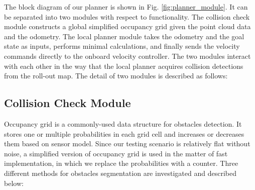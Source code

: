\documentclass[../thesis.tex]{subfiles}
\begin{document}
The block diagram of our planner is shown in Fig. \ref{fig:planner_module}. 
It can be separated into two modules with respect to functionality. 
The collision check module constructs a global simplified occupancy grid given the point cloud data and the odometry. 
The local planner module takes the odometry and the goal state as inputs, performs minimal calculations, and finally sends the velocity commands directly to the onboard velocity controller.
The two modules interact with each other in the way that the local planner acquires collision detections from the roll-out map.
The detail of two modules is described as follows:
 
 
\subsection{Collision Check Module}
 
Occupancy grid is a commonly-used data structure for obstacles detection. 
It stores one or multiple probabilities in each grid cell and increases or decreases them based on sensor model. 
Since our testing scenario is relatively flat without noise, a simplified version of occupancy grid is used in the matter of fast implementation, in which we replace the probabilities with a counter. 
Three different methods for obstacles segmentation are investigated and described below:
 
\end{document}
